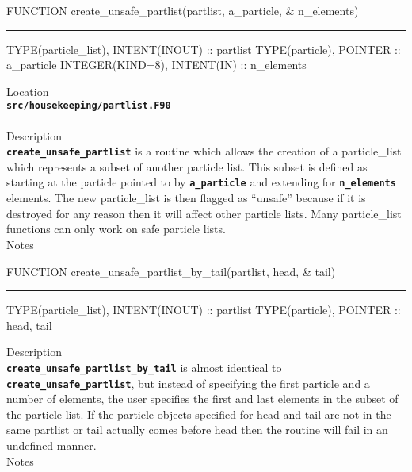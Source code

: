 \documentclass[12pt,a4paper]{article}
\newcommand{\HRule}{\rule[0.3cm]{\linewidth}{0.5mm}}
\newcommand{\inlinecode}[1]{{\color{warwickred} \bf\texttt{#1}}}
\begin{document}
\pagebreak
\begin{codedef}
FUNCTION create_unsafe_partlist(partlist, a_particle, &
    n_elements)
\HRule
TYPE(particle_list), INTENT(INOUT) :: partlist
TYPE(particle), POINTER :: a_particle
INTEGER(KIND=8), INTENT(IN) :: n_elements
\end{codedef}
\vspace{1cm}
{\Large Location\\}
\inlinecode{src/housekeeping/partlist.F90}\\
\\[0.5cm]
{\Large Description\\}
\inlinecode{create\_unsafe\_partlist} is a routine which allows the creation of
a particle\_list which represents a subset of another particle list. This subset
is defined as starting at the particle pointed to by \inlinecode{a\_particle}
and extending for \inlinecode{n\_elements} elements. The new particle\_list is
then flagged as ``unsafe'' because if it is destroyed for any reason then it
will affect other particle lists. Many particle\_list functions can only work
on safe particle lists.
\\[0.5cm]
{\Large Notes\\}

\pagebreak
\begin{codedef}
FUNCTION create_unsafe_partlist_by_tail(partlist, head, &
    tail)
\HRule
TYPE(particle_list), INTENT(INOUT) :: partlist
TYPE(particle), POINTER :: head, tail
\end{codedef}
\vspace{1cm}
{\Large Description\\}
\inlinecode{create\_unsafe\_partlist\_by\_tail} is almost identical to
\inlinecode{create\_unsafe\_partlist}, but instead of specifying the first
particle and a number of elements, the user specifies the first and last
elements in the subset of the particle list. If the particle objects specified
for head and tail are not in the same partlist or tail actually comes before
head then the routine will fail in an undefined manner.
\\[0.5cm]
{\Large Notes\\}
\end{document}
